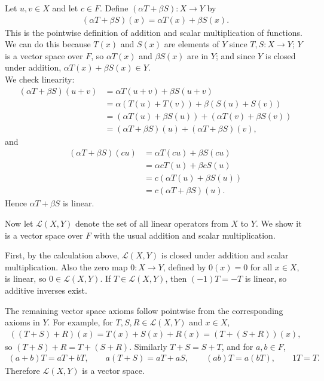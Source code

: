 \documentclass{article}
\begin{document}
\begin{mdframed}[linewidth=1pt]
Let $u,v \in X$ and let $c \in F$. Define $(\alpha T+\beta S):X\to Y$ by
\begin{align*}
(\alpha T+\beta S)(x)=\alpha T(x)+\beta S(x).
\end{align*}
This is the pointwise definition of addition and scalar multiplication of functions. We can do this because $T(x)$ and $S(x)$ are elements of $Y$ since $T,S:X\to Y$; $Y$ is a vector space over $F$, so $\alpha T(x)$ and $\beta S(x)$ are in $Y$; and since $Y$ is closed under addition, $\alpha T(x)+\beta S(x)\in Y$. \\

We check linearity:
\begin{align*}
(\alpha T+\beta S)(u+v)
&=\alpha T(u+v)+\beta S(u+v) \\
&=\alpha(T(u)+T(v))+\beta(S(u)+S(v)) \\
&=(\alpha T(u)+\beta S(u))+(\alpha T(v)+\beta S(v)) \\
&=(\alpha T+\beta S)(u)+(\alpha T+\beta S)(v),
\end{align*}
and
\begin{align*}
(\alpha T+\beta S)(cu)
&=\alpha T(cu)+\beta S(cu) \\
&=\alpha cT(u)+\beta cS(u) \\
&=c(\alpha T(u)+\beta S(u)) \\
&=c(\alpha T+\beta S)(u).
\end{align*}
Hence $\alpha T+\beta S$ is linear.

Now let $\mathcal{L}(X,Y)$ denote the set of all linear operators from $X$ to $Y$. We show it is a vector space over $F$ with the usual addition and scalar multiplication.

First, by the calculation above, $\mathcal{L}(X,Y)$ is closed under addition and scalar multiplication. Also the zero map $0:X\to Y$, defined by $0(x)=0$ for all $x\in X$, is linear, so $0\in \mathcal{L}(X,Y)$. If $T\in \mathcal{L}(X,Y)$, then $(-1)T=-T$ is linear, so additive inverses exist.

The remaining vector space axioms follow pointwise from the corresponding axioms in $Y$. For example, for $T,S,R\in \mathcal{L}(X,Y)$ and $x\in X$,
\begin{align*}
((T+S)+R)(x)=T(x)+S(x)+R(x)=(T+(S+R))(x),
\end{align*}
so $(T+S)+R=T+(S+R)$. Similarly $T+S=S+T$, and for $a,b\in F$,
\begin{align*}
(a+b)T=aT+bT,\qquad a(T+S)=aT+aS,\qquad (ab)T=a(bT),\qquad 1T=T.
\end{align*}
Therefore $\mathcal{L}(X,Y)$ is a vector space.
\end{mdframed}
\end{document}
